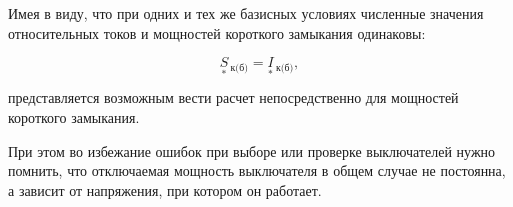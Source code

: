 Имея в виду, что при одних и тех же базисных условиях численные значения относительных токов и мощностей короткого замыкания одинаковы:

\begin{equation} %
	\label{eq:2-39 S_kz_baz_from_I_kz}
	\underset{*}{S}\!\,_{\text{к(б)}} = \underset{*}{I}\!\,_{\text{к(б)}},
\end{equation}

представляется возможным вести расчет непосредственно для мощностей короткого замыкания.

При этом во избежание ошибок при выборе или проверке выключателей нужно помнить, что отключаемая мощность выключателя в общем случае не постоянна, а зависит от напряжения, при котором он работает.